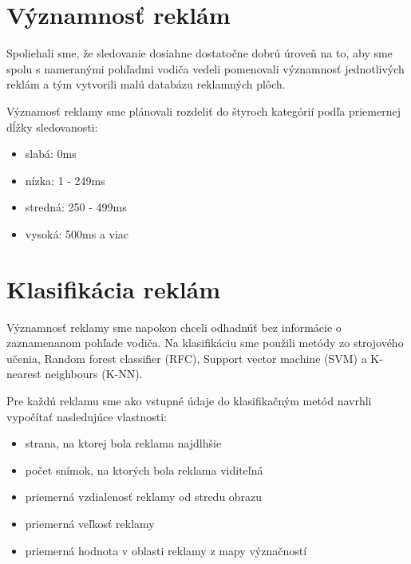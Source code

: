 \section{Významnosť reklám}

Spoliehali sme, že sledovanie dosiahne dostatočne dobrú úroveň na to, aby sme spolu s nameranými pohľadmi vodiča vedeli pomenovali významnosť jednotlivých reklám a tým vytvorili malú databázu reklamných plôch. 


Významosť reklamy sme plánovali rozdeliť do štyroch kategórií podľa priemernej dĺžky sledovanosti: 

\begin{itemize}
  \item slabá: 0ms
  \item nízka: 1 - 249ms
  \item stredná: 250 - 499ms
  \item vysoká: 500ms a viac 
\end{itemize}


\section{Klasifikácia reklám}

Významnosť reklamy sme napokon chceli odhadnúť bez informácie o zaznamenanom pohľade vodiča. Na klasifikáciu sme použili metódy zo strojového učenia, Random forest classifier (RFC), Support vector machine (SVM) a K-nearest neighbours (K-NN). 


Pre každú reklamu sme ako vstupné údaje do klasifikačným metód navrhli vypočítať nasledujúce vlastnosti: %

\begin{itemize}
  \item strana, na ktorej bola reklama najdlhšie
  \item počet snímok, na ktorých bola reklama viditeľná
  \item priemerná vzdialenosť reklamy od stredu obrazu
  \item priemerná veľkosť reklamy
  \item priemerná hodnota v oblasti reklamy z mapy význačností %
\end{itemize}

